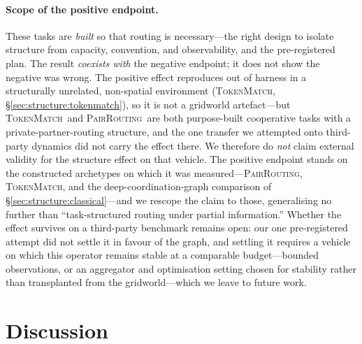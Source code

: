 \documentclass[10pt]{article}
\newcommand{\pairrouting}{\textsc{PairRouting}}
\newcommand{\tokenmatch}{\textsc{TokenMatch}}
\begin{document}
\paragraph{Scope of the positive endpoint.} These tasks are \emph{built} so
that routing is necessary---the right design to isolate structure from
capacity, convention, and observability, and the pre-registered plan. The
result \emph{coexists with} the negative endpoint; it does not show the
negative was wrong. The positive effect reproduces out of harness in a
structurally unrelated, non-spatial environment (\tokenmatch,
\S\ref{sec:structure:tokenmatch}), so it is not a gridworld artefact---but
\tokenmatch\ and \pairrouting\ are both purpose-built cooperative tasks with a
private-partner-routing structure, and the one transfer we attempted onto
third-party dynamics did not carry the effect there. We therefore do
\emph{not} claim external validity for the structure effect on that vehicle.
The positive endpoint stands on the constructed archetypes on which it was
measured---\pairrouting, \tokenmatch, and the deep-coordination-graph
comparison of \S\ref{sec:structure:classical}---and we rescope the claim to
those, generalising no further than ``task-structured routing under partial
information.'' Whether the effect survives on a third-party benchmark remains
open: our one pre-registered attempt did not settle it in favour of the graph,
and settling it requires a vehicle on which this operator remains stable at a
comparable budget---bounded observations, or an aggregator and optimisation
setting chosen for stability rather than transplanted from the
gridworld---which we leave to future work.

\section{Discussion}
\label{sec:discussion}
\end{document}
